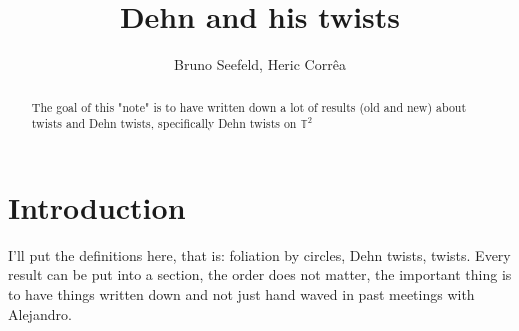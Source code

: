 \documentclass{article}
\title{Dehn and his twists}
\author{Bruno Seefeld, Heric Corrêa}
\begin{document}
\maketitle


\begin{abstract}
The goal of this "note" is to have written down a lot of results (old and new)
about twists and Dehn twists, specifically Dehn twists on $\mathbb{T}^2$


\end{abstract}


\section{Introduction}

I'll put the definitions here, that is: foliation by circles, Dehn twists,
twists. Every result can be put into a section, the order does not matter,
the important thing is to have things written down and not just hand waved in past
meetings with Alejandro.
\end{document}
